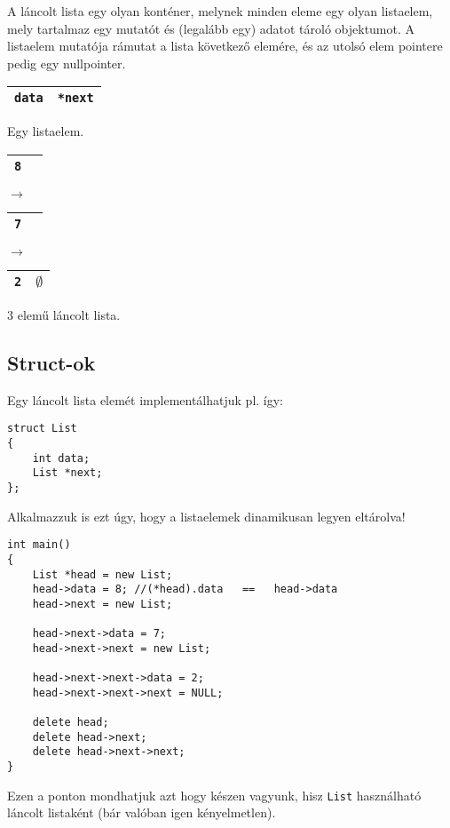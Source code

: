 \documentclass[a4paper,11.5pt,table]{article}
\begin{document}
	\smallskip
	A láncolt lista egy olyan konténer, melynek minden eleme egy olyan listaelem, mely tartalmaz egy mutatót és (legalább egy) adatot tároló objektumot. A listaelem mutatója rámutat a lista következő elemére, és az utolsó elem pointere pedig egy nullpointer.
	\begin{center}
		\begin{tabular}{|c|c|}
			\hline
			\texttt{data}&\texttt{*next}\\
			\hline
		\end{tabular}
		\smallskip
		
		Egy listaelem.
		\medskip
		
		\begin{tabular}{|c|c|}
			\hline
			\texttt{8}&\texttt{}\\
			\hline
		\end{tabular}$\rightarrow$
		\begin{tabular}{|c|c|}
			\hline
			\texttt{7}&\texttt{}\\
			\hline
		\end{tabular}$\rightarrow$
		\begin{tabular}{|c|c|}
			\hline
			\texttt{2}&\texttt{$\emptyset$}\\
			\hline
		\end{tabular}
		\smallskip
		
		3 elemű láncolt lista.
	\end{center}
	\subsection{Struct-ok}
	Egy láncolt lista elemét implementálhatjuk pl. így:
	\begin{lstlisting}
struct List
{
	int data;
	List *next;
};
	\end{lstlisting}
	Alkalmazzuk is ezt úgy, hogy  a listaelemek dinamikusan legyen eltárolva!
	\begin{lstlisting}
int main()
{
	List *head = new List;
	head->data = 8; //(*head).data   ==   head->data
	head->next = new List;
	
	head->next->data = 7;
	head->next->next = new List;
	
	head->next->next->data = 2;
	head->next->next->next = NULL;
	
	delete head;
	delete head->next;
	delete head->next->next;
}
	\end{lstlisting}
	Ezen a ponton mondhatjuk azt hogy készen vagyunk, hisz \texttt{List} használható láncolt listaként (bár valóban igen kényelmetlen).
	\medskip
	
\end{document}

